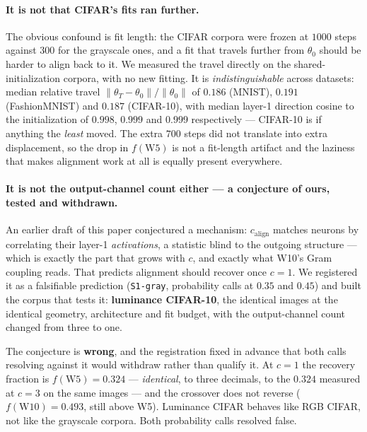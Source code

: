 \documentclass[10pt,letterpaper]{article}
\theoremstyle{definition}
\newcommand{\calign}{c_{\mathrm{align}}}
\begin{document}
\paragraph{It is not that CIFAR's fits ran further.} The obvious confound is fit length: the
CIFAR corpora were frozen at $1000$ steps against $300$ for the grayscale ones, and a fit that
travels further from $\theta_0$ should be harder to align back to it. We measured the travel
directly on the shared-initialization corpora, with no new fitting. It is
\emph{indistinguishable} across datasets: median relative travel
$\|\theta_T - \theta_0\| / \|\theta_0\|$ of $0.186$ (MNIST), $0.191$ (FashionMNIST) and $0.187$
(CIFAR-10), with median layer-1 direction cosine to the initialization of $0.998$, $0.999$ and
$0.999$ respectively --- CIFAR-10 is if anything the \emph{least} moved. The extra $700$ steps did
not translate into extra displacement, so the drop in $f(\mathrm{W5})$ is not a fit-length
artifact and the laziness that makes alignment work at all is equally present everywhere.

\paragraph{It is not the output-channel count either --- a conjecture of ours, tested and
withdrawn.} An earlier draft of this paper conjectured a mechanism: $\calign$ matches neurons by
correlating their layer-1 \emph{activations}, a statistic blind to the outgoing structure --- which
is exactly the part that grows with $c$, and exactly what W10's Gram coupling reads. That predicts
alignment should recover once $c=1$. We registered it as a falsifiable prediction
(\texttt{S1-gray}, probability calls at $0.35$ and $0.45$) and built the corpus that tests it:
\textbf{luminance CIFAR-10}, the identical images at the identical geometry, architecture and fit
budget, with the output-channel count changed from three to one.



The conjecture is \textbf{wrong}, and the registration fixed in advance that both calls resolving
against it would withdraw rather than qualify it. At $c=1$ the recovery fraction is $f(\mathrm{W5}) = 0.324$ ---
\emph{identical}, to three decimals, to the $0.324$ measured at $c=3$ on the same images --- and the
crossover does not reverse ($f(\mathrm{W10}) = 0.493$, still above W5). Luminance CIFAR behaves like
RGB CIFAR, not like the grayscale corpora. Both probability calls resolved false.
\end{document}
